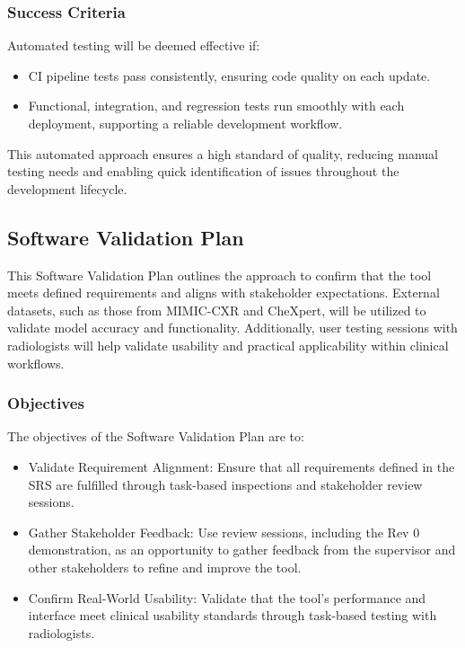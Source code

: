 \documentclass[12pt, titlepage]{article}
\begin{document}
\subsubsection{Success Criteria}
Automated testing will be deemed effective if:
\begin{itemize}
  \item CI pipeline tests pass consistently, ensuring code quality on each update.
  \item Functional, integration, and regression tests run smoothly with each deployment, supporting a reliable development workflow.
\end{itemize}
This automated approach ensures a high standard of quality, reducing manual testing needs and enabling quick identification of issues throughout the development lifecycle.

\subsection{Software Validation Plan}
This Software Validation Plan outlines the approach to confirm that the tool meets defined requirements and aligns with stakeholder expectations. External datasets, such as those from MIMIC-CXR and CheXpert, will be utilized to validate model accuracy and functionality. Additionally, user testing sessions with radiologists will help validate usability and practical applicability within clinical workflows.

\subsubsection{Objectives}
The objectives of the Software Validation Plan are to:
\begin{itemize}
  \item Validate Requirement Alignment: Ensure that all requirements defined in the SRS are fulfilled through task-based inspections and stakeholder review sessions.
  \item Gather Stakeholder Feedback: Use review sessions, including the Rev 0 demonstration, as an opportunity to gather feedback from the supervisor and other stakeholders to refine and improve the tool.
  \item Confirm Real-World Usability: Validate that the tool’s performance and interface meet clinical usability standards through task-based testing with radiologists.
\end{itemize}
\end{document}

